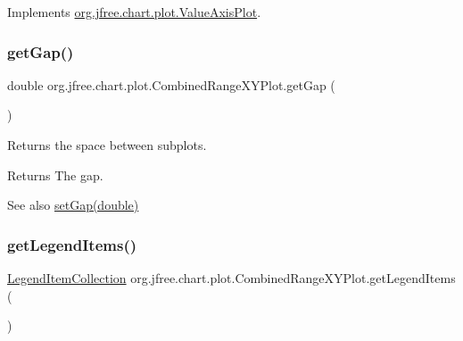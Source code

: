 Implements \mbox{\hyperlink{interfaceorg_1_1jfree_1_1chart_1_1plot_1_1_value_axis_plot_a54815b2f078c11b2618804fe3e7e5353}{org.\+jfree.\+chart.\+plot.\+Value\+Axis\+Plot}}.

\mbox{\label{classorg_1_1jfree_1_1chart_1_1plot_1_1_combined_range_x_y_plot_a8a2945d6449e0f4b02327dbae7239ae3}} 
\subsubsection{\texorpdfstring{get\+Gap()}{getGap()}}
{\footnotesize\ttfamily double org.\+jfree.\+chart.\+plot.\+Combined\+Range\+X\+Y\+Plot.\+get\+Gap (\begin{DoxyParamCaption}{ }\end{DoxyParamCaption})}

Returns the space between subplots.

\begin{DoxyReturn}{Returns}
The gap.
\end{DoxyReturn}
\begin{DoxySeeAlso}{See also}
\mbox{\hyperlink{classorg_1_1jfree_1_1chart_1_1plot_1_1_combined_range_x_y_plot_ab573b42e04de09b389acf8c17b31a3c2}{set\+Gap(double)}} 
\end{DoxySeeAlso}
\mbox{\label{classorg_1_1jfree_1_1chart_1_1plot_1_1_combined_range_x_y_plot_a5b4e754fb06e91d483aa6850c74a36a3}} 
\subsubsection{\texorpdfstring{get\+Legend\+Items()}{getLegendItems()}}
{\footnotesize\ttfamily \mbox{\hyperlink{classorg_1_1jfree_1_1chart_1_1_legend_item_collection}{Legend\+Item\+Collection}} org.\+jfree.\+chart.\+plot.\+Combined\+Range\+X\+Y\+Plot.\+get\+Legend\+Items (\begin{DoxyParamCaption}{ }\end{DoxyParamCaption})}

